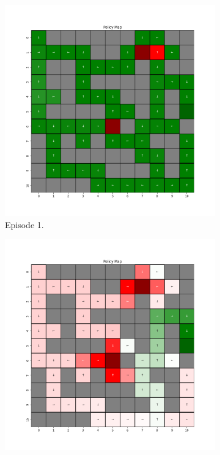 \documentclass{assignment}
\begin{document}
\begin{figure}[H]
    \begin{subfigure}{0.3\textwidth}
        \includegraphics[width=\textwidth]{figures/policy_td/alpha_sweep/policy_alpha_0.5_gamma_0.95_epsilon_0.2_iteration_1.png}
    \caption{Episode 1.}
    \end{subfigure}\hfill
    \begin{subfigure}{0.3\textwidth}
        \includegraphics[width=\textwidth]{figures/policy_td/alpha_sweep/policy_alpha_0.5_gamma_0.95_epsilon_0.2_iteration_50.png}

\end{subfigure}
\end{figure}
\end{document}
